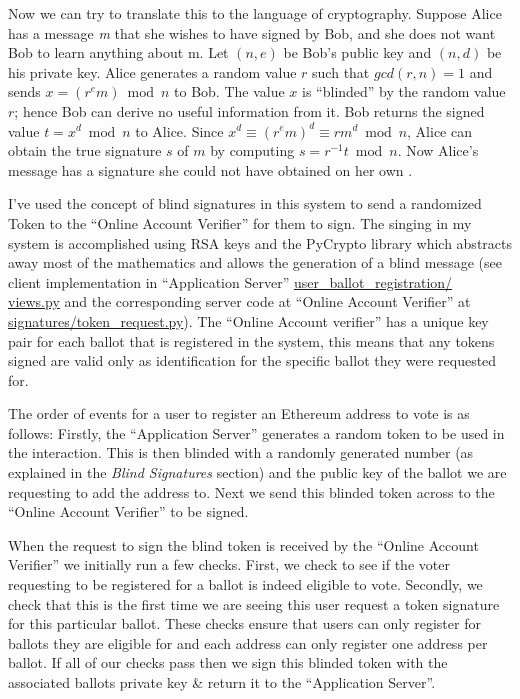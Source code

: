 \documentclass{article}
\begin{document}
\begin{adjustwidth}{0.5cm}{}
	Now we can try to translate this to the language of cryptography. Suppose Alice has a message \textit{m} that she wishes to have signed by Bob, and she does not want Bob to learn anything about m. Let \((n,e)\) be Bob's public key and \((n,d)\) be his private key. Alice generates a random value \(r\) such that \(gcd(r, n) = 1\) and sends \(x = (r^e m) \bmod n\) to Bob. The value \(x\) is ``blinded'' by the random value \(r\); hence Bob can derive no useful information from it. Bob returns the signed value \(t = x^d \bmod n\) to Alice. Since \(x^d \equiv (r^e m)^d \equiv rm^d \bmod n\), Alice can obtain the true signature \(s\) of \(m\) by computing \(s = r^{-1} t \bmod n\). Now Alice's message has a signature she could not have obtained on her own \citep{65_bellovin_2015}.
\end{adjustwidth}

I've used the concept of blind signatures in this system to send a randomized Token to the ``Online Account Verifier'' for them to sign. The singing in my system is accomplished using RSA keys and the PyCrypto library \citep{66_pycrypto_the_python_cryptography_toolkit_2017} which abstracts away most of the mathematics and allows the generation of a blind message (see client implementation in ``Application Server'' \href{https://github.com/Mattie432/Blockchain-Voting-System/blob/master/Programming/2_ApplicationServer/user_ballot_registration/views.py#L135}{user\_ballot\_registration/\\views.py} and the corresponding server code at ``Online Account Verifier'' at \href{https://github.com/Mattie432/Blockchain-Voting-System/blob/master/Programming/3_OnlineAccountVerifier/signatures/token_request.py}{signatures/token\_request.py}). The ``Online Account verifier'' has a unique key pair for each ballot that is registered in the system, this means that any tokens signed are valid only as identification for the specific ballot they were requested for.

The order of events for a user to register an Ethereum address to vote is as follows: Firstly, the ``Application Server'' generates a random token to be used in the interaction. This is then blinded with a randomly generated number (as explained in the \textit{Blind Signatures} section) and the public key of the ballot we are requesting to add the address to. Next we send this blinded token across to the ``Online Account Verifier'' to be signed.

When the request to sign the blind token is received by the ``Online Account Verifier'' we initially run a few checks. First, we check to see if the voter requesting to be registered for a ballot is indeed eligible to vote. Secondly, we check that this is the first time we are seeing this user request a token signature for this particular ballot. These checks ensure that users can only register for ballots they are eligible for and each address can only register one address per ballot. If all of our checks pass then we sign this blinded token with the associated ballots private key \& return it to the ``Application Server''.
\end{document}
